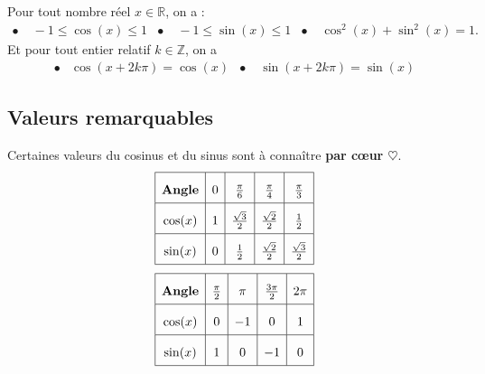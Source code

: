 \documentclass[11pt]{article}
\begin{document}
\begin{prop}
  Pour tout nombre réel $x\in\mathbb{R}$, on a :\\[-7mm]
  \begin{align*}
    \bullet&\; -1\leq\cos(x)\leq 1 &
    \bullet&\; -1\leq\sin(x)\leq 1 &
    \bullet&\; \cos^2(x)+\sin^2(x) = 1.
  \end{align*}
  Et pour tout entier relatif $k\in\mathbb{Z}$, on a\\[-7mm]
  \begin{align*}
    \bullet&\cos(x+2k\pi) = \cos(x) &
    \bullet&\;\sin(x+2k\pi)=\sin(x)
  \end{align*}
\end{prop}

\subsection{Valeurs remarquables}
\noindent\begin{minipage}{.3\textwidth}
Certaines valeurs du cosinus et du sinus sont à connaître
\textbf{par cœur $\heartsuit$}.
\[
  \def\arraystretch{2}
  \begin{array}[]{|c|c|c|c|c|}
    \hline
    \textbf{Angle} & 0 & \frac{\pi}{6} & \frac{\pi}{4} & \frac{\pi}{3} \\
    \hline
    \cos(x) & 1 & \frac{\sqrt3}{2} & \frac{\sqrt2}{2} &
    \frac{1}{2} \\
    \hline
    \sin(x) & 0 & \frac{1}{2} & \frac{\sqrt2}{2} & \frac{\sqrt3}{2} \\
    \hline
  \end{array}
\]
\[
  \def\arraystretch{2}
  \begin{array}[]{|c|c|c|c|c|}
    \hline
    \textbf{Angle} & \frac{\pi}{2} & \pi & \frac{3\pi}{2} & 2\pi \\
    \hline
    \cos(x) & 0 & -1 & 0 & 1 \\
    \hline
    \sin(x) & 1 & 0 & -1
    & 0 \\
    \hline
  \end{array}
\]

\end{minipage}
\end{document}
